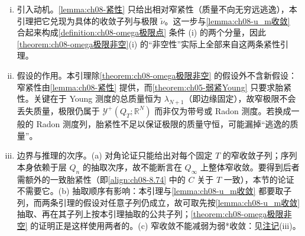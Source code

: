 \documentclass[../../main.tex]{subfiles}%
\begin{document}
\begin{remark}\label{remark:ch08-ν_m收敛}
\begin{enumerate}[(i)]
\item 引入动机。\cref{lemma:ch08-紧性} 只给出相对窄紧性（质量不向无穷远逃逸），本引理把它兑现为具体的收敛子列与极限 $\tilde\nu$。这一步与\cref{lemma:ch08-u_m收敛} 合起来构成\cref{definition:ch08-omega极限点} 条件 (i) 的两个分量，因此\cref{theorem:ch08-omega极限非空}(i) 的“非空性”实际上全部来自这两条紧性引理。
\item 假设的作用。本引理除\cref{theorem:ch08-omega极限非空} 的假设外不含新假设：窄紧性由\cref{lemma:ch08-紧性} 提供，而\cref{theorem:ch05-弱紧Young} 只要求胎紧性。关键在于 Young 测度的总质量恒为 $\lambda_{N+1}$（即边缘固定），故窄极限不会丢失质量，极限仍属于 $\mathcal{Y}^+(Q_T;\mathbb{R}^N)$ 而非仅为带号或 Radon 测度。若换成一般的 Radon 测度列，胎紧性不足以保证极限的质量守恒，可能漏掉“逃逸的质量”。
\item 边界与推理的次序。(a) 对角论证只能给出对每个固定 $T$ 的窄收敛子列；序列本身依赖于层 $Q_n$ 的抽取次序，故不能断言在 $Q_\infty$ 上整体窄收敛。要得到后者需额外的一致胎紧性（即\eqref{align:ch08-8.74} 中的 $C$ 关于 $T$ 一致），本节的论证不需要它。(b) 抽取顺序有影响：本引理与\cref{lemma:ch08-u_m收敛} 都要取子列，而两条引理的假设对任意子列仍成立，故可取先按\cref{lemma:ch08-u_m收敛} 抽取、再在其子列上按本引理抽取的公共子列；\cref{theorem:ch08-omega极限非空} 的证明正是这样使用两者的。(c) 窄收敛不能减弱为弱*收敛：见\hyperref[remark:ch08-omega极限点]{注记}(iii)。
\end{enumerate}
\end{remark}
\end{document}
